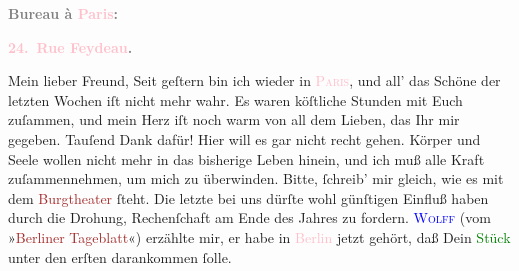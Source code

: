            \begin{otherlanguage}{french}\textcolor{gray}{\textbf{\textbf{Bureau à \textcolor{pink}{Paris}{}\ledrightnote{\textcolor{pink}{Paris}}:}}}\end{otherlanguage}\pend
           \pstart
           \begin{otherlanguage}{french}\textcolor{gray}{\textbf{\textbf{\textcolor{pink}{24. Rue Feydeau}{}\ledrightnote{\textcolor{pink}{rue Feydeau}}.}}}\end{otherlanguage}\pend
           \pstart\center{}Mein lieber Freund,\pend\pstart
           Seit geſtern bin ich wieder in \textsc{\textcolor{pink}{Paris}{}\ledrightnote{\textcolor{pink}{Paris}}}, und all’ das Schöne der letzten Wochen iſt nicht mehr wahr. Es waren köſtliche
               Stunden mit Euch zuſammen, und mein Herz iſt noch warm \strikeout{\textcolor{gray}{×}} von all dem Lieben, das Ihr mir gegeben. Tauſend Dank dafür!\pend
           \pstart
           Hier will es gar nicht recht gehen. \strikeout{\textcolor{gray}{×}\-\textcolor{gray}{×}\-\textcolor{gray}{×}} Körper und Seele wollen nicht mehr in das bisherige Leben hinein, und ich muß
               alle Kraft zuſammennehmen, um mich zu überwinden.\pend
           \pstart
           {\pb}Bitte, ſchreib’ mir gleich, wie es mit dem \textcolor{brown}{Burgtheater}{}\ledrightnote{\textcolor{brown}{Burgtheater}} ſteht. Die letzte \label{K_L02747-2v}\label{K_L02747-2h} bei uns dürſte wohl günſtigen Einfluß haben durch die Drohung, Rechenſchaft
               am Ende des Jahres zu fordern.\pend
           \pstart
           \textcolor{blue}{\textsc{Wolff}}{}\ledrightnote{\textcolor{blue}{Theodor Wolff}} (vom »\textcolor{brown}{Berliner Tageblatt}{}\ledrightnote{\textcolor{brown}{Berliner Tageblatt}}«) erzählte mir, er
               habe in \textcolor{pink}{Berlin}{}\ledrightnote{\textcolor{pink}{Berlin}} jetzt gehört, daß Dein \textcolor{green}{Stück}{} unter den erſten  darankommen ſolle.\pend
